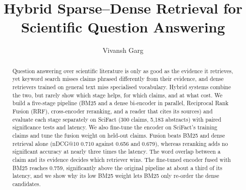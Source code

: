 \documentclass[runningheads]{llncs}
\begin{document}
\setlength{\emergencystretch}{1em} %

\title{Hybrid Sparse--Dense Retrieval for Scientific Question Answering}

\author{Vivansh Garg}

\maketitle

\begin{abstract}
Question answering over scientific literature is only as good as the evidence it
retrieves, yet keyword search misses claims phrased differently from their
evidence, and dense retrievers trained on general text miss specialised
vocabulary. Hybrid systems combine the two, but rarely show which stage helps,
for which claims, and at what cost. We build a five-stage pipeline (BM25 and a
dense bi-encoder in parallel, Reciprocal Rank Fusion (RRF), cross-encoder
reranking, and a reader that cites its sources) and evaluate each stage
separately on SciFact (300 claims, 5{,}183 abstracts) with paired significance
tests and latency. We also fine-tune the encoder on SciFact's training claims and
tune the fusion weight on held-out claims. Fusion beats BM25 and dense retrieval
alone (nDCG@10 0.710 against 0.656 and 0.679), whereas reranking adds no
significant accuracy at nearly three times the latency. The word overlap between
a claim and its evidence decides which retriever wins. The fine-tuned encoder
fused with BM25 reaches 0.759, significantly above the original pipeline at about
a third of its latency, and we show why its low BM25 weight lets BM25 only
re-order the dense candidates.

\end{abstract}
\end{document}
